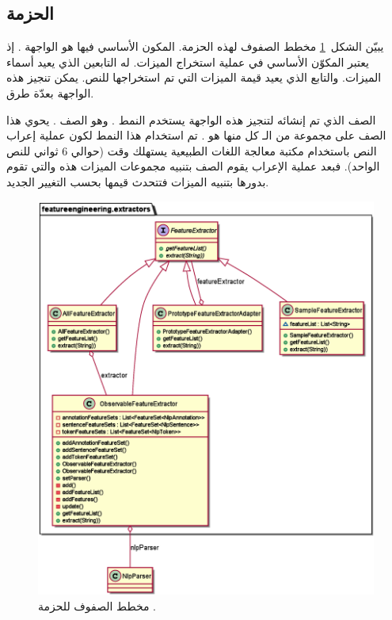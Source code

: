 \subsection{الحزمة }
يبيّن الشكل~\ref{fig:cd:extractors} مخطط الصفوف لهذه الحزمة.
المكون الأساسي فيها هو الواجهة .
إذ يعتبر المكوّن الأساسي في عملية استخراج الميزات.
له التابعين
الذي يعيد أسماء الميزات.
والتابع
الذي يعيد قيمة الميزات التي تم استخراجها للنص.
يمكن تنجيز هذه الواجهة بعدّة طرق.

الصف الذي تم إنشائه لتنجيز هذه الواجهة يستخدم النمط .
وهو الصف .
يحوي هذا الصف على مجموعة من الـ  كل منها هو .
تم استخدام هذا النمط لكون عملية إعراب النص 
باستخدام مكتبة معالجة اللغات الطبيعية يستهلك وقت (حوالي 6 ثواني للنص الواحد).
فبعد عملية الإعراب يقوم الصف بتنبيه مجموعات الميزات هذه والتي تقوم بدورها بتنبيه الميزات فتتحدث قيمها بحسب التغيير الجديد.

\begin{figure}[htb]
	\centering
	\includegraphics[width=0.8\linewidth]{images/cd-extractors.eps}
	\caption{%
		مخطط الصفوف للحزمة .
	}
	\label{fig:cd:extractors}
\end{figure}



